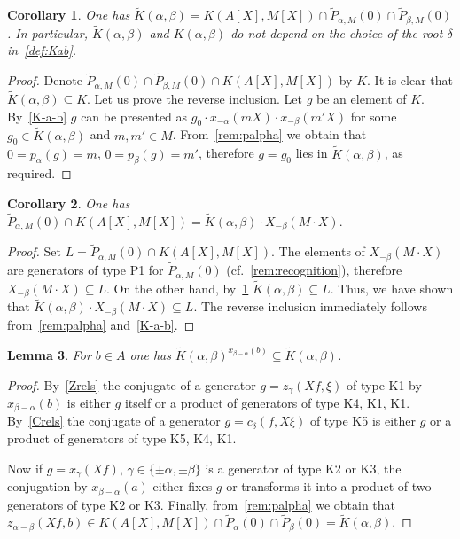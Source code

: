 \documentclass[oneside, 8pt]{amsart}
\newtheorem{lemma}{Lemma}
\newtheorem{corollary}[lemma]{Corollary}
\theoremstyle{remark}
\theoremstyle{definition}
\numberwithin{lemma}{section}
\numberwithin{prop}{section}
\numberwithin{corollary}{section}
\numberwithin{externaltheorem}{section}
\numberwithin{equation}{section}
\begin{document}
\begin{corollary} \label{K-a-b-cor}
One has $\widetilde{K}(\alpha, \beta) = K(A[X], M[X]) \cap \widetilde{P}_{\alpha, M}(0) \cap \widetilde{P}_{\beta, M}(0)$. In particular, $\widetilde{K}(\alpha, \beta)$ and $K(\alpha, \beta)$ do not depend on the choice of the root $\delta$ in~\cref{def:Kab}.
\end{corollary}
\begin{proof} Denote $\widetilde{P}_{\alpha, M}(0) \cap \widetilde{P}_{\beta, M}(0) \cap K(A[X], M[X])$ by $K$. It is clear that $\widetilde{K}(\alpha, \beta) \subseteq K$. 
Let us prove the reverse inclusion. Let $g$ be an element of $K$.
By~\cref{K-a-b} $g$ can be presented as $g_0 \cdot x_{-\alpha}(mX) \cdot x_{-\beta}(m'X)$ for some $g_0 \in \widetilde{K}(\alpha, \beta)$ and $m, m' \in M$. From~\cref{rem:palpha} we obtain that $0 = p_\alpha(g) = m$, $0 = p_\beta(g) = m'$, therefore $g = g_0$ lies in $\widetilde{K}(\alpha, \beta)$, as required.\end{proof}

\begin{corollary} \label{K-a-b-cor2}
 One has $\widetilde{P}_{\alpha, M}(0) \cap K(A[X], M[X]) = \widetilde{K}(\alpha, \beta) \cdot X_{-\beta}(M \cdot X).$ 
\end{corollary}
\begin{proof} Set $L = \widetilde{P}_{\alpha, M}(0) \cap K(A[X], M[X])$.
The elements of $X_{-\beta}(M\cdot X)$ are generators of type P1 for $\widetilde{P}_{\alpha, M}(0)$ (cf.~\cref{rem:recognition}),
 therefore $X_{-\beta}(M \cdot X) \subseteq L$. On the other hand, by~\cref{K-a-b-cor} $\widetilde{K}(\alpha, \beta) \subseteq L$. Thus, we have shown that $\widetilde{K}(\alpha, \beta) \cdot X_{-\beta}(M \cdot X) \subseteq L$. The reverse inclusion immediately follows from~\cref{rem:palpha} and~\cref{K-a-b}.
 \end{proof}
 
\begin{lemma} \label{conj-K-a-b} For $b \in A$ one has $\widetilde{K}(\alpha, \beta)^{x_{\beta - \alpha}(b)} \subseteq \widetilde{K}(\alpha, \beta)$. \end{lemma}
\begin{proof} By~\cref{Zrels} the conjugate of a generator $g = z_\gamma(Xf, \xi)$ of type K1 by $x_{\beta-\alpha}(b)$ is either $g$ itself or a product of generators of type K4, K1, K1. By~\cref{Crels} the conjugate of a generator $g = c_\delta(f, X\xi)$ of type K5 is either $g$ or a product of generators of type K5, K4, K1.

Now if $g = x_\gamma(Xf)$, $\gamma \in \{\pm \alpha, \pm \beta\}$ is a generator of type K2 or K3, the conjugation by $x_{\beta-\alpha}(a)$ either fixes $g$ or transforms it into a product of two generators of type K2 or K3.  Finally, from~\cref{rem:palpha} we obtain that $z_{\alpha-\beta}(Xf, b) \in K(A[X], M[X]) \cap \widetilde{P}_\alpha(0) \cap \widetilde{P}_{\beta}(0) = \widetilde{K}(\alpha, \beta)$. \end{proof}  
\end{document}
